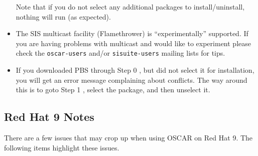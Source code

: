 \begin{itemize}
  Note that if you do not select any additional packages to
  install/uninstall, nothing will run (as expected).

\item The SIS multicast facility (Flamethrower) is ``experimentally'' 
  supported.  If you are having problems with multicast and would like 
  to experiment please check the {\tt oscar-users} and/or 
  {\tt sisuite-users} mailing lists for tips.

\item If you downloaded PBS through Step 0 , but did not select it for installation, you will get
  an error message complaining about conflicts. The way around this is to goto
  Step 1 , select the
  package, and then unselect it.

\endchange

\end{itemize}


\subsection{Red Hat 9 Notes}
\label{subsec:rh90notes}

There are a few issues that may crop up when using OSCAR on Red Hat 9.
The following items highlight these issues.

